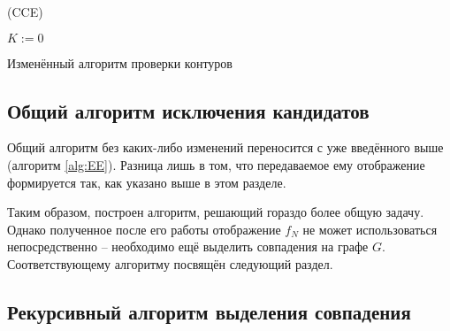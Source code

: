 \begin{algorithm}[H]
	\Large
	\Begin(CCE){
		$K := 0$
		
	}
	
	\caption{Изменённый алгоритм проверки контуров}
	\label{alg:MCCE}
\end{algorithm}


\subsection{Общий алгоритм исключения кандидатов}

Общий алгоритм без каких-либо изменений переносится с уже введённого выше (алгоритм \ref{alg:EE}). Разница лишь в том, что передаваемое ему отображение формируется так, как указано выше в этом разделе.

Таким образом, построен алгоритм, решающий гораздо более общую задачу. Однако полученное после его работы отображение $f_N$ не может использоваться непосредственно -- необходимо ещё выделить совпадения на графе $G$. Соответствующему алгоритму посвящён следующий раздел.

\subsection{Рекурсивный алгоритм выделения совпадения}

